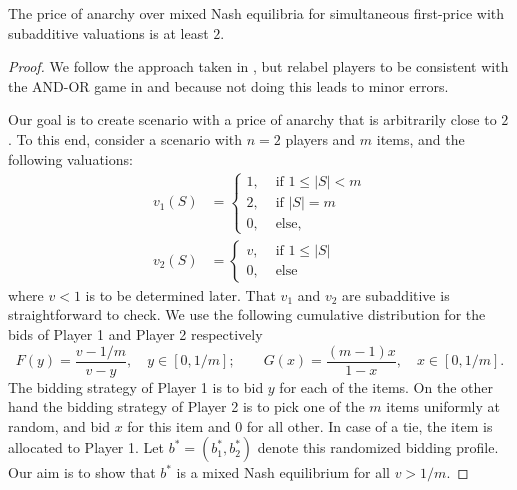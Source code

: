 \begin{theorem}
  The price of anarchy over mixed Nash equilibria for simultaneous first-price with subadditive valuations is at least $ 2 $.
\end{theorem}
\begin{proof}
  We follow the approach taken in \cite[Theorem 4.1]{Christodoulou2016TightBounds}, but relabel players to be consistent with the AND-OR game in \cite{10.1145/1993574.1993619} and because not doing this leads to minor errors.

  Our goal is to create scenario with a price of anarchy that is arbitrarily close to $ 2 $. To this end, consider a scenario with $ n = 2 $ players and $ m $ items, and the following valuations:
  \begin{align*}
      v_1(S) &= \begin{cases}
        1, &\text{ if }1 \leq |S| < m\\
        2, &\text{ if } |S| = m \\
        0, &\text{ else,}
      \end{cases} \\
    v_2(S) &= \begin{cases}
      v, &\text{ if } 1 \leq |S| \\
      0, &\text{ else}
    \end{cases}
  \end{align*}
  where $ v <1 $ is to be determined later.
  That $ v_1 $ and $ v_2 $ are subadditive is straightforward to check. We use the following cumulative distribution for the bids of Player 1 and Player 2 respectively
  \begin{equation}
    F(y) = \frac{v - 1 /m}{v - y},\quad y \in [0, 1 /m];\quad\quad G(x) = \frac{(m-1)x}{1-x},\quad x \in [0, 1 /m].
  \end{equation}
   The bidding strategy of Player 1 is to bid $ y $ for each of the items. On the other hand the bidding strategy of Player 2 is to pick one of the $ m $ items uniformly at random, and bid $ x $ for this item and $ 0 $ for all other. In case of a tie, the item is allocated to Player 1. Let $ b^{*}=(b_1^{*}, b_2^{*}) $ denote this randomized bidding profile. Our aim is to show that $ b^{*} $ is a mixed Nash equilibrium for all $ v > 1 /m $.



\end{proof}
